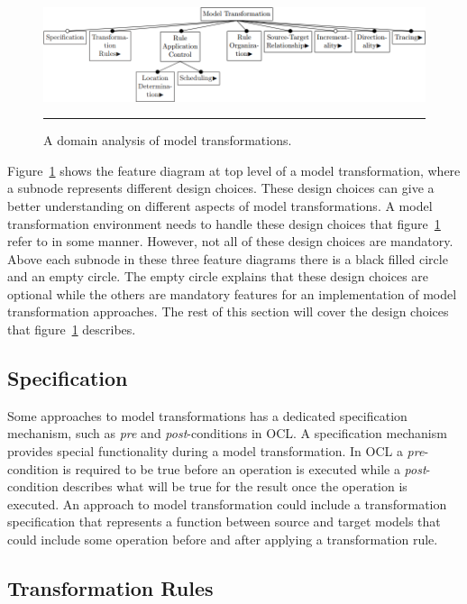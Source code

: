 \begin{figure}[H]
  \centering
    \includegraphics[scale=0.65]{./Figures/Model_Transformation_Survey_1.png}
    \rule{35em}{0.5pt}
  \caption[Domain Analysis of Model Transformations]
  				{A domain analysis of model transformations.}
  \label{fig:Model_Transformation_Survey}
\end{figure}

Figure~\ref{fig:Model_Transformation_Survey} shows the feature diagram at top
level of a model transformation, where a subnode represents different design
choices. These design choices can give
a better understanding on different aspects of model transformations. A model
transformation environment needs to handle these design choices that
figure~\ref{fig:Model_Transformation_Survey} refer to in some manner. However,
not all of these design choices are mandatory.
Above each subnode in these three feature diagrams there is a black filled
circle and an empty circle. The empty circle explains that these design choices
are optional while the others are mandatory features for an implementation of
model transformation approaches. The rest of this section will cover the design choices that
figure~\ref{fig:Model_Transformation_Survey} describes. 

\subsection{Specification}

Some approaches to model transformations has a dedicated specification
mechanism, such as \textit{pre} and \textit{post}-conditions in OCL. A
specification mechanism provides special functionality during a model
transformation. In OCL a \textit{pre}-condition is required to be true before
an operation is executed while a \textit{post}-condition describes what will be
true for the result once the operation is executed. An approach to model
transformation could include a transformation specification that represents a
function between source and target models that could include some operation
before and after applying a transformation rule.

\subsection{Transformation Rules}


